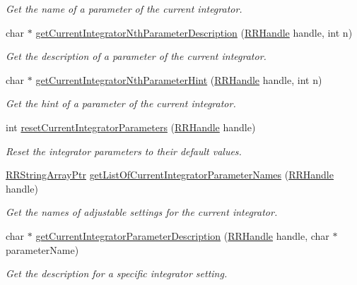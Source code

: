 \begin{DoxyCompactItemize}
\begin{DoxyCompactList}\small\item\em Get the name of a parameter of the current integrator. \end{DoxyCompactList}\item 
char $\ast$ \hyperlink{group__simopts_ga2e525f711d43789ec1170f043f86f127}{get\+Current\+Integrator\+Nth\+Parameter\+Description} (\hyperlink{rrc__types_8h_a1d68f0592372208fa5a5f2799ea4b3ae}{R\+R\+Handle} handle, int n)
\begin{DoxyCompactList}\small\item\em Get the description of a parameter of the current integrator. \end{DoxyCompactList}\item 
char $\ast$ \hyperlink{group__simopts_gafa723d0091d673126b4330ec9d6dca11}{get\+Current\+Integrator\+Nth\+Parameter\+Hint} (\hyperlink{rrc__types_8h_a1d68f0592372208fa5a5f2799ea4b3ae}{R\+R\+Handle} handle, int n)
\begin{DoxyCompactList}\small\item\em Get the hint of a parameter of the current integrator. \end{DoxyCompactList}\item 
int \hyperlink{group__simopts_gaefa42b6e122d13988bde99fcf6e050d6}{reset\+Current\+Integrator\+Parameters} (\hyperlink{rrc__types_8h_a1d68f0592372208fa5a5f2799ea4b3ae}{R\+R\+Handle} handle)
\begin{DoxyCompactList}\small\item\em Reset the integrator parameters to their default values. \end{DoxyCompactList}\item 
\hyperlink{rrc__types_8h_a7c9475df6c7337d99482b13a365e7596}{R\+R\+String\+Array\+Ptr} \hyperlink{group__simopts_ga8bc1ea6950f141d40373416d64abaefa}{get\+List\+Of\+Current\+Integrator\+Parameter\+Names} (\hyperlink{rrc__types_8h_a1d68f0592372208fa5a5f2799ea4b3ae}{R\+R\+Handle} handle)
\begin{DoxyCompactList}\small\item\em Get the names of adjustable settings for the current integrator. \end{DoxyCompactList}\item 
char $\ast$ \hyperlink{group__simopts_gae4308a0893d84e49ef877d2db65d110c}{get\+Current\+Integrator\+Parameter\+Description} (\hyperlink{rrc__types_8h_a1d68f0592372208fa5a5f2799ea4b3ae}{R\+R\+Handle} handle, char $\ast$parameter\+Name)
\begin{DoxyCompactList}\small\item\em Get the description for a specific integrator setting. \end{DoxyCompactList}\item 

\end{DoxyCompactItemize}
